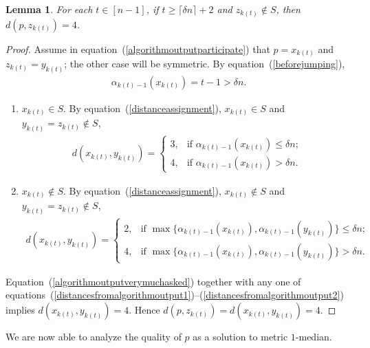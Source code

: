 \documentclass[letterpaper,12pt]{article}
\newtheorem{lemma}[theorem]{Lemma}
\begin{document}
\begin{lemma}\label{algorithmoutputtypicaldistances}
For each $t\in[n-1]$, if $t\ge \lceil\delta n\rceil+2$ and $z_{k(t)}\notin S$,
then
$d(p,z_{k(t)})=4$.
\end{lemma}
\begin{proof}
Assume in equation~(\ref{algorithmoutputparticipate}) that
$p=x_{k(t)}$ and $z_{k(t)}=y_{k(t)}$; the other case will be symmetric.
By equation~(\ref{beforejumping}),
\begin{eqnarray}
\alpha_{k(t)-1}\left(x_{k(t)}\right)=t-1> \delta n.
\label{algorithmoutputverymuchasked}
\end{eqnarray}
\begin{enumerate}[{Case }1:]
\item $x_{k(t)}\in S$.
By equation~(\ref{distanceassignment}),
$x_{k(t)}\in S$
and $y_{k(t)}=z_{k(t)}\notin S$,
\begin{eqnarray}
d\left(x_{k(t)},y_{k(t)}\right)
=
\left\{
\begin{array}{ll}
3, &\text{if $\alpha_{k(t)-1}(x_{k(t)})\le \delta n$;}\\
4, &\text{if $\alpha_{k(t)-1}(x_{k(t)})> \delta n$.}
\end{array}
\right.
\label{distancesfromalgorithmoutput1}
\end{eqnarray}
\item $x_{k(t)}\notin S$.
By equation~(\ref{distanceassignment}),
$x_{k(t)}\notin S$
and $y_{k(t)}=z_{k(t)}\notin S$,
\begin{eqnarray}
d\left(x_{k(t)},y_{k(t)}\right)
=
\left\{
\begin{array}{ll}
2, &\text{if $\max\{\alpha_{k(t)-1}(x_{k(t)}),\alpha_{k(t)-1}(y_{k(t)})\}\le \delta n$;}\\
4, &\text{if $\max\{\alpha_{k(t)-1}(x_{k(t)}),\alpha_{k(t)-1}(y_{k(t)})\}> \delta n$.}
\end{array}
\right.
\label{distancesfromalgorithmoutput2}
\end{eqnarray}
\end{enumerate}
Equation~(\ref{algorithmoutputverymuchasked})
together with any one of
equations~(\ref{distancesfromalgorithmoutput1})--(\ref{distancesfromalgorithmoutput2})
implies $d(x_{k(t)},y_{k(t)})=4$.
Hence $d(p,z_{k(t)})=d(x_{k(t)},y_{k(t)})=4$.
\end{proof}

We are now able to analyze the quality of $p$ as a solution to
{\sc metric $1$-median}.
\end{document}
